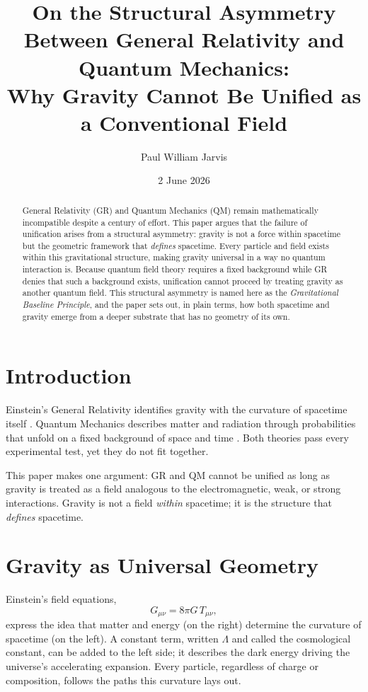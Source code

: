 \documentclass[12pt]{article}
\title{\textbf{On the Structural Asymmetry Between General Relativity and Quantum Mechanics:\\
Why Gravity Cannot Be Unified as a Conventional Field}}
\author[1]{Paul William Jarvis}
\affil[1]{Independent Researcher, United Kingdom \\ ORCID: 0009-0009-8933-857X}
\date{2 June 2026}
\begin{document}
\maketitle

\begin{abstract}
General Relativity (GR) and Quantum Mechanics (QM) remain mathematically incompatible despite a century of effort. This paper argues that the failure of unification arises from a structural asymmetry: gravity is not a force within spacetime but the geometric framework that \emph{defines} spacetime. Every particle and field exists within this gravitational structure, making gravity universal in a way no quantum interaction is. Because quantum field theory requires a fixed background while GR denies that such a background exists, unification cannot proceed by treating gravity as another quantum field. This structural asymmetry is named here as the \emph{Gravitational Baseline Principle}, and the paper sets out, in plain terms, how both spacetime and gravity emerge from a deeper substrate that has no geometry of its own.
\end{abstract}

\section{Introduction}

Einstein's General Relativity identifies gravity with the curvature of spacetime itself \cite{einstein1916}. Quantum Mechanics describes matter and radiation through probabilities that unfold on a fixed background of space and time \cite{dirac1930}. Both theories pass every experimental test, yet they do not fit together.

This paper makes one argument: GR and QM cannot be unified as long as gravity is treated as a field analogous to the electromagnetic, weak, or strong interactions. Gravity is not a field \emph{within} spacetime; it is the structure that \emph{defines} spacetime.

\section{Gravity as Universal Geometry}

Einstein's field equations,
\begin{equation}
G_{\mu\nu} = 8\pi G\, T_{\mu\nu},
\end{equation}
express the idea that matter and energy (on the right) determine the curvature of spacetime (on the left). A constant term, written $\Lambda$ and called the cosmological constant, can be added to the left side; it describes the dark energy driving the universe's accelerating expansion. Every particle, regardless of charge or composition, follows the paths this curvature lays out.
\end{document}
